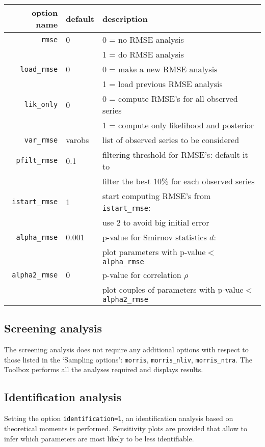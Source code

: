 \documentclass[12pt,a4paper]{article}
\begin{document}
\begin{tabular}{r|l|l}
                 option name & default & description  \\ \hline
                \verb"rmse"& 0& 0 = no RMSE analysis\\
                           &  & 1 = do RMSE analysis \\
            \verb"load_rmse"& 0& 0 = make a new RMSE analysis\\
                            &  & 1 = load previous RMSE analysis \\
             \verb"lik_only"& 0& 0 = compute RMSE's for all observed series\\
                            &  & 1 = compute only likelihood and posterior \\
             \verb"var_rmse"& varobs& list of observed series to be considered\\
           \verb"pfilt_rmse"& 0.1& filtering threshold for RMSE's: default it to\\
                            &    & filter the best 10\% for each observed series\\
          \verb"istart_rmse"& 1& start computing RMSE's from \verb"istart_rmse":\\
                            &  & use 2 to avoid big initial error \\
           \verb"alpha_rmse"& 0.001& p-value for Smirnov statistics $d$:\\
                            &   & plot parameters with p-value$<$\verb"alpha_rmse"\\
          \verb"alpha2_rmse"& 0& p-value for correlation $\rho$\\
                            &  & plot couples of parameters with
                            p-value$<$\verb"alpha2_rmse"\\
\end{tabular}

\subsection{Screening analysis}
The screening analysis does not require any additional options
with respect to those listed in the `Sampling options':
\verb"morris", \verb"morris_nliv", \verb"morris_ntra". The Toolbox
performs all the analyses required and displays results.


\subsection{Identification analysis}
Setting the option \verb"identification=1", an identification
analysis based on theoretical moments is performed. Sensitivity plots are provided that
allow to infer which parameters are most likely to be less
identifiable.
\end{document}
